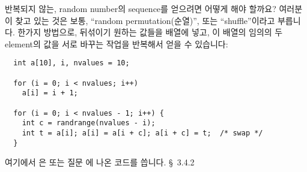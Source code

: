 \begin{faq}
	반복되지 않는, random number의 sequence를 얻으려면 어떻게 해야 할까요?
\A
	여러분이 찾고 있는 것은 보통, ``random permutation(순열)'', 또는
        ``shuffle''이라고 부릅니다.  한가지 방법으로, 뒤섞이기 원하는
        값들을 배열에 넣고, 이 배열의 임의의 두 element의 값을 서로
        바꾸는 작업을 반복해서 얻을 수 있습니다:
\begin{verbatim}
  int a[10], i, nvalues = 10;

  for (i = 0; i < nvalues; i++)
    a[i] = i + 1;

  for (i = 0; i < nvalues - 1; i++) {
    int c = randrange(nvalues - i);
    int t = a[i]; a[i] = a[i + c]; a[i + c] = t;  /* swap */
  }
\end{verbatim}
	\noindent 여기에서 은
         또는 질문 에 나온
        코드를 씁니다.
\R
	\cite{knuth} \S\ 3.4.2 
\end{faq}


